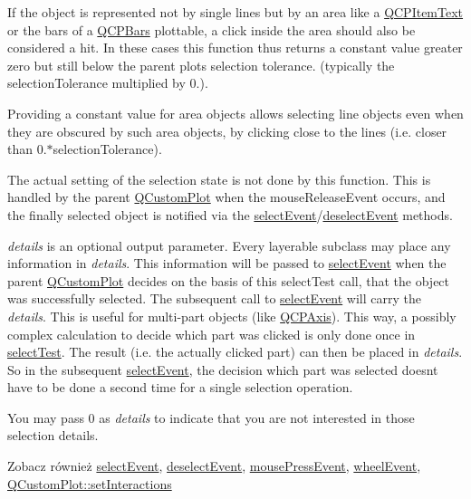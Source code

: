 If the object is represented not by single lines but by an area like a \hyperlink{class_q_c_p_item_text}{Q\+C\+P\+Item\+Text} or the bars of a \hyperlink{class_q_c_p_bars}{Q\+C\+P\+Bars} plottable, a click inside the area should also be considered a hit. In these cases this function thus returns a constant value greater zero but still below the parent plot\textquotesingle{}s selection tolerance. (typically the selection\+Tolerance multiplied by 0.).

Providing a constant value for area objects allows selecting line objects even when they are obscured by such area objects, by clicking close to the lines (i.\+e. closer than 0.$\ast$selection\+Tolerance).

The actual setting of the selection state is not done by this function. This is handled by the parent \hyperlink{class_q_custom_plot}{Q\+Custom\+Plot} when the mouse\+Release\+Event occurs, and the finally selected object is notified via the \hyperlink{class_q_c_p_abstract_item_aa4b969c58797f39c9c0b6c07c7869d17}{select\+Event}/\hyperlink{class_q_c_p_abstract_item_af9093798cb07a861dcc73f93ca16c0c1}{deselect\+Event} methods.

{\itshape details} is an optional output parameter. Every layerable subclass may place any information in {\itshape details}. This information will be passed to \hyperlink{class_q_c_p_abstract_item_aa4b969c58797f39c9c0b6c07c7869d17}{select\+Event} when the parent \hyperlink{class_q_custom_plot}{Q\+Custom\+Plot} decides on the basis of this select\+Test call, that the object was successfully selected. The subsequent call to \hyperlink{class_q_c_p_abstract_item_aa4b969c58797f39c9c0b6c07c7869d17}{select\+Event} will carry the {\itshape details}. This is useful for multi-\/part objects (like \hyperlink{class_q_c_p_axis}{Q\+C\+P\+Axis}). This way, a possibly complex calculation to decide which part was clicked is only done once in \hyperlink{class_q_c_p_abstract_item_ae41d0349d68bb802c49104afd100ba2a}{select\+Test}. The result (i.\+e. the actually clicked part) can then be placed in {\itshape details}. So in the subsequent \hyperlink{class_q_c_p_abstract_item_aa4b969c58797f39c9c0b6c07c7869d17}{select\+Event}, the decision which part was selected doesn\textquotesingle{}t have to be done a second time for a single selection operation.

You may pass 0 as {\itshape details} to indicate that you are not interested in those selection details.

\begin{DoxySeeAlso}{Zobacz również}
\hyperlink{class_q_c_p_abstract_item_aa4b969c58797f39c9c0b6c07c7869d17}{select\+Event}, \hyperlink{class_q_c_p_abstract_item_af9093798cb07a861dcc73f93ca16c0c1}{deselect\+Event}, \hyperlink{class_q_c_p_layerable_af6567604818db90f4fd52822f8bc8376}{mouse\+Press\+Event}, \hyperlink{class_q_c_p_layerable_a47dfd7b8fd99c08ca54e09c362b6f022}{wheel\+Event}, \hyperlink{class_q_custom_plot_a5ee1e2f6ae27419deca53e75907c27e5}{Q\+Custom\+Plot\+::set\+Interactions} 
\end{DoxySeeAlso}


